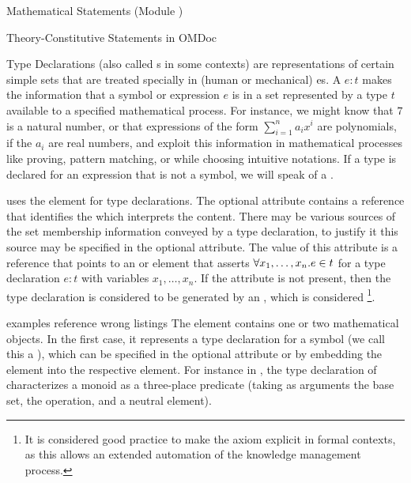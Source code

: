 \begin{tchapter}[id=statements,short=Mathematical Statements]{Mathematical Statements (Module {})}
\begin{tsection}[id=definitions]{Theory-Constitutive Statements in OMDoc}
\begin{tsubsection}[id=type-axioms]{Type Declarations}
  {} (also called {s} in some contexts) are
  representations of certain simple sets that are treated specially in (human or
  mechanical) {es}. A {} $e\colon
  t$ makes the information that a symbol or expression $e$ is in a set represented by a
  type $t$ available to a specified mathematical process.  For instance, we might know
  that $7$ is a natural number, or that expressions of the form $\sum_{i=1}^n a_ix^{i}$
  are polynomials, if the $a_i$ are real numbers, and exploit this information in
  mathematical processes like proving, pattern matching, or while choosing intuitive
  notations. If a type is declared for an expression that is not a symbol, we will speak
  of a {}.
  
  {\omdoc} uses the {} element for type declarations. The optional attribute
  {} contains a {} reference that identifies the
  {} which interprets the content. There may be various sources of
  the set membership information conveyed by a type declaration, to justify it this source
  may be specified in the optional {} attribute. The value of
  this attribute is a {} reference that points to an {}
  or {} element that asserts ${\forall{x_1,\ldots,x_n}.{e\in t}}$ for a type
  declaration $e\colon t$ with variables $x_1,\ldots,x_n$.  If the
  {} attribute is not present, then the type declaration is
  considered to be generated by an {}, which is considered
  {}\footnote{It is considered good practice to make the
    axiom explicit in formal contexts, as this allows an extended automation of the
    knowledge management process.}.
  
\begin{erratum}[reported-by=Christoph Lange,date=2010-01-11]{examples reference wrong listings}
  The {} element contains one or two mathematical objects. In the first
  case, it represents a type declaration for a symbol (we call this a
  {}), which can be specified in the optional
  {} attribute or by embedding the {} element into the
  respective {} element. For instance in , the type
  declaration of {} characterizes a monoid as a three-place predicate
  (taking as arguments the base set, the operation, and a neutral element).


\end{erratum}
\end{tsubsection}
\end{tsection}
\end{tchapter}

